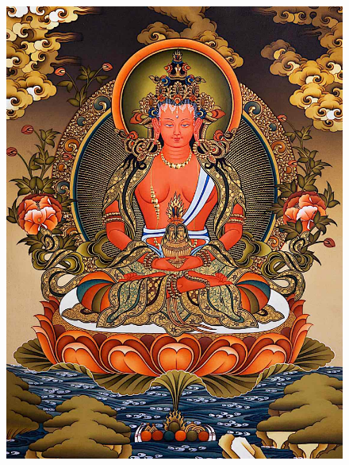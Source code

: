 \begin{figure}
 	\begin{center}
		\includegraphics[width=\linewidth]{Buddha-Weekly-Amitayus-Amitabha-Buddhism.jpg}
	\end{center}
\end{figure} 

